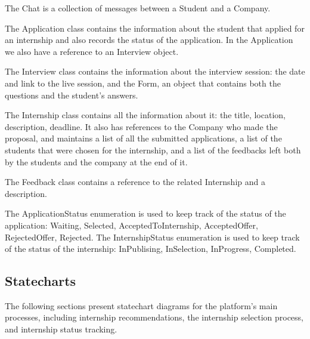 The Chat is a collection of messages between a Student and a Company.

The Application class contains the information about the student that applied for an internship and also records the status of the application. In the
Application we also have a reference to an Interview object.

The Interview class contains the information about the interview session: the date and link to the live session, and the Form, an object that contains 
both the questions and the student's answers.

The Internship class contains all the information about it: the title, location, description, deadline. It also has references to the Company who made 
the proposal, and maintains a list of all the submitted applications, a list of the students that were chosen for the internship, and a list of
the feedbacks left both by the students and the company at the end of it.

The Feedback class contains a reference to the related Internship and a description.

The ApplicationStatus enumeration is used to keep track of the status of the application: Waiting, Selected, AcceptedToInternship, AcceptedOffer,
RejectedOffer, Rejected.
The InternshipStatus enumeration is used to keep track of the status of the internship: InPublising, InSelection, InProgress, Completed.

\subsection{Statecharts}\label{subsec:statecharts}
The following sections present statechart diagrams for the platform's main processes, including internship recommendations, the internship 
selection process, and internship status tracking. 

